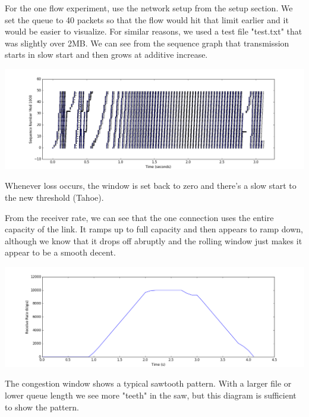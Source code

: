 \documentclass[11pt]{article}
\begin{document}
For the one flow experiment, use the network setup from the setup section. We set the queue to 40 packets so that the flow would hit that limit earlier and it would be easier to visualize. For similar reasons, we used a test file "test.txt" that was slightly over 2MB. We can see from the sequence graph that transmission starts in slow start and then grows at additive increase.

\vspace{5mm}

\includegraphics[width=17cm]{charts/one/sequence.png}

\vspace{5mm}

Whenever loss occurs, the window is set back to zero and there's a slow start to the new threshold (Tahoe).

\vspace{5mm}

From the receiver rate, we can see that the one connection uses the entire capacity of the link. It ramps up to full capacity and then appears to ramp down, although we know that it drops off abruptly and the rolling window just makes it appear to be a smooth decent.

\vspace{5mm}

\includegraphics[width=17cm]{charts/one/rateTime1.png}

\vspace{5mm}

The congestion window shows a typical sawtooth pattern. With a larger file or lower queue length we see more "teeth" in the saw, but this diagram is sufficient to show the pattern.
\end{document}
